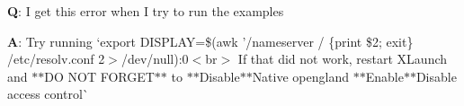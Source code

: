 {\bfseries{Q}}\+: I get this error when I try to run the examples 
\begin{DoxyCode}{0}
\end{DoxyCode}


{\bfseries{A}}\+: Try running `export D\+I\+S\+P\+L\+AY=\$(awk '/nameserver / \{print \$2; exit\}\textquotesingle{} /etc/resolv.conf 2$>$/dev/null)\+:0{\ttfamily $<$br$>$ If that did not work, restart X\+Launch and $\ast$$\ast$\+DO N\+OT F\+O\+R\+G\+E\+T$\ast$$\ast$ to $\ast$$\ast$\+Disable$\ast$$\ast$}Native opengl{\ttfamily and $\ast$$\ast$\+Enable$\ast$$\ast$}Disable access control\`{} 